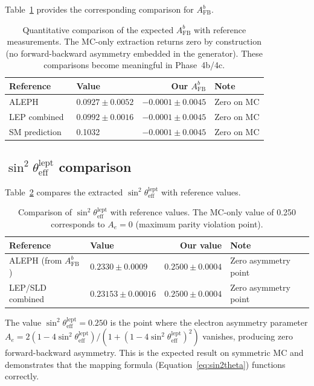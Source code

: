 \documentclass[11pt,a4paper]{article}
\begin{document}
Table~\ref{tab:afb_comparison} provides the corresponding comparison for $A_\mathrm{FB}^b$.

\begin{table}[htbp]
\centering
\caption{Quantitative comparison of the expected $A_\mathrm{FB}^b$ with reference
measurements. The MC-only extraction returns zero by construction (no forward-backward
asymmetry embedded in the generator). These comparisons become meaningful in Phase~4b/4c.}
\label{tab:afb_comparison}
\begin{tabular}{llrl}
\toprule
Reference & Value & Our $A_\mathrm{FB}^b$ & Note \\
\midrule
ALEPH~\cite{ALEPH:AFBb} & $0.0927 \pm 0.0052$ & $-0.0001 \pm 0.0045$ & Zero on MC \\
LEP combined~\cite{LEP:EWWG:2005} & $0.0992 \pm 0.0016$ & $-0.0001 \pm 0.0045$ & Zero on MC \\
SM prediction~\cite{LEP:EWWG:2005} & 0.1032 & $-0.0001 \pm 0.0045$ & Zero on MC \\
\bottomrule
\end{tabular}
\end{table}

\subsection{$\sin^2\theta_\mathrm{eff}^\mathrm{lept}$ comparison}
\label{sec:sin2theta_comparison}

Table~\ref{tab:sin2theta_comparison} compares the extracted $\sin^2\theta_\mathrm{eff}^\mathrm{lept}$
with reference values.

\begin{table}[htbp]
\centering
\caption{Comparison of $\sin^2\theta_\mathrm{eff}^\mathrm{lept}$ with reference values.
The MC-only value of 0.250 corresponds to $A_e = 0$ (maximum parity violation point).}
\label{tab:sin2theta_comparison}
\begin{tabular}{llrl}
\toprule
Reference & Value & Our value & Note \\
\midrule
ALEPH (from $A_\mathrm{FB}^b$)~\cite{ALEPH:AFBb} & $0.2330 \pm 0.0009$ & $0.2500 \pm 0.0004$ & Zero asymmetry point \\
LEP/SLD combined~\cite{LEP:EWWG:2005} & $0.23153 \pm 0.00016$ & $0.2500 \pm 0.0004$ & Zero asymmetry point \\
\bottomrule
\end{tabular}
\end{table}

The value $\sin^2\theta_\mathrm{eff}^\mathrm{lept} = 0.250$ is the point where
the electron asymmetry parameter $A_e = 2(1 - 4\sin^2\theta_\mathrm{eff}^\mathrm{lept})/
(1 + (1 - 4\sin^2\theta_\mathrm{eff}^\mathrm{lept})^2)$ vanishes, producing zero
forward-backward asymmetry. This is the expected result on symmetric MC and demonstrates
that the mapping formula (Equation~\ref{eq:sin2theta}) functions correctly.
\end{document}
